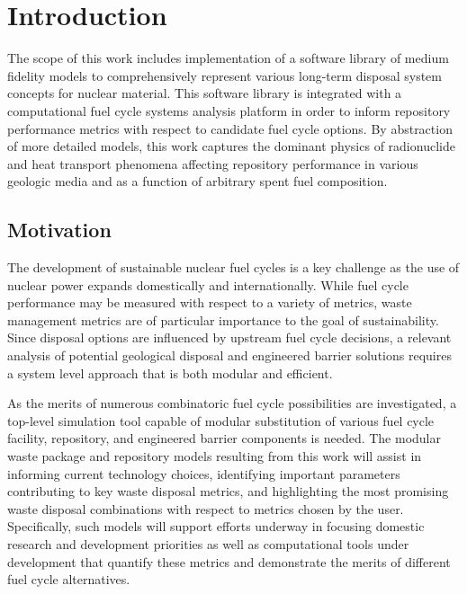 \chapter{Introduction}\label{ch:introduction}


The scope of this work includes implementation of a software library of medium 
fidelity models to comprehensively represent various long-term disposal system 
concepts for nuclear material. This software library is integrated with a 
computational fuel cycle systems analysis platform in order to inform repository 
performance metrics with respect to candidate fuel cycle options. By abstraction 
of more detailed models, this work captures the dominant physics of 
radionuclide and heat transport phenomena affecting repository performance in 
various geologic media and as a function of arbitrary spent fuel composition. 

\section{Motivation} 


The development of sustainable nuclear fuel cycles is a key challenge as the use 
of nuclear power expands domestically and internationally. While fuel cycle 
performance may be measured with respect to a variety of metrics, waste
management metrics are of particular importance to the goal of sustainability. 
Since disposal options are influenced by upstream fuel cycle decisions, a 
relevant analysis of potential geological disposal and engineered barrier 
solutions requires a system level approach that is both modular and efficient. 


As the merits of numerous combinatoric fuel cycle possibilities are 
investigated, a top-level simulation tool capable of modular substitution of 
various fuel cycle facility, repository, and engineered barrier components is 
needed. The modular waste package and repository models resulting from this work 
will assist in informing current technology choices, identifying important 
parameters contributing to key waste disposal metrics, and highlighting the most 
promising waste disposal combinations with respect to metrics chosen by
the user. Specifically, such models will support efforts underway in focusing 
domestic research and development priorities as well as computational tools 
under development that quantify these metrics and demonstrate the merits of 
different fuel cycle alternatives. 

